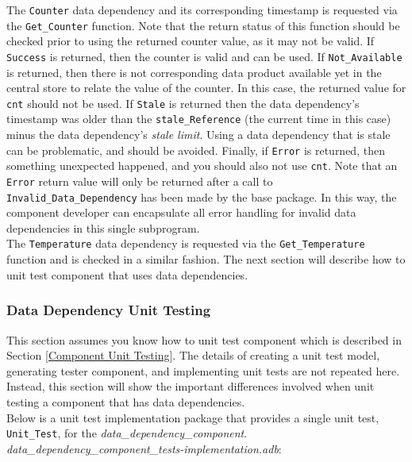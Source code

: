 The \texttt{Counter} data dependency and its corresponding timestamp is requested via the \texttt{Get\_Counter} function. Note that the return status of this function should be checked prior to using the returned counter value, as it may not be valid. If \texttt{Success} is returned, then the counter is valid and can be used. If \texttt{Not\_Available} is returned, then there is not corresponding data product available yet in the central store to relate the value of the counter. In this case, the returned value for \texttt{cnt} should not be used. If \texttt{Stale} is returned then the data dependency's timestamp was older than the \texttt{stale\_Reference} (the current time in this case) minus the data dependency's \textit{stale limit}. Using a data dependency that is stale can be problematic, and should be avoided. Finally, if \texttt{Error} is returned, then something unexpected happened, and you should also not use \texttt{cnt}. Note that an \texttt{Error} return value will only be returned after a call to \texttt{Invalid\_Data\_Dependency} has been made by the base package. In this way, the component developer can encapsulate all error handling for invalid data dependencies in this single subprogram. \\

The \texttt{Temperature} data dependency is requested via the \texttt{Get\_Temperature} function and is checked in a similar fashion. The next section will describe how to unit test component that uses data dependencies. \\

\subsubsection{Data Dependency Unit Testing}

This section assumes you know how to unit test component which is described in Section \ref{Component Unit Testing}. The details of creating a unit test model, generating tester component, and implementing unit tests are not repeated here. Instead, this section will show the important differences involved when unit testing a component that has data dependencies. \\

Below is a unit test implementation package that provides a single unit test, \texttt{Unit\_Test}, for the \textit{data\_dependency\_component}. \\

\textit{data\_dependency\_component\_tests-implementation.adb}:

